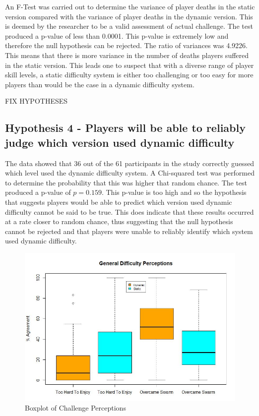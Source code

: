 \documentclass[journal]{IEEEtran}
\begin{document}
An F-Test was carried out to determine the variance of player deaths in the static version compared with the variance of player deaths in the dynamic version. This is deemed by the researcher to be a valid assessment of actual challenge. The test produced a p-value of less than 0.0001. This p-value is extremely low and therefore the null hypothesis can be rejected. The ratio of variances was 4.9226. This means that there is more variance in the number of deaths players suffered in the static version. This leads one to suspect that with a diverse range of player skill levels, a static difficulty system is either too challenging or too easy for more players than would be the case in a dynamic difficulty system.

FIX HYPOTHESES

\subsection{Hypothesis 4 - Players will be able to reliably judge which version used dynamic difficulty}

The data showed that 36 out of the 61 participants in the study correctly guessed which level used the dynamic difficulty system. A Chi-squared test was performed to determine the probability that this was higher that random chance. The test produced a p-value of $p = 0.159$. This p-value is too high and so the hypothesis that suggests players would be able to predict which version used dynamic difficulty cannot be said to be true. This does indicate that these results occurred at a rate closer to random chance, thus suggesting that the null hypothesis cannot be rejected and that players were unable to reliably identify which system used dynamic difficulty. 



\begin{figure}[h]
	\includegraphics[width=1.0\linewidth]{difficultyperceptions.jpg}
	\caption{Boxplot of Challenge Perceptions}
	\label{fig::7}
\end{figure} 
\end{document}
